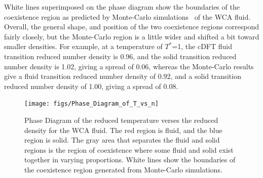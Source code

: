 \documentclass[double,12pt]{beavtex}
\begin{document}
White lines superimposed on the phase diagram show the boundaries of the 
coexistence region as predicted by Monte-Carlo simulations~\cite{May} 
of the WCA fluid. 
Overall, the general shape, and position of the two coexistence regions 
correspond fairly closely, but the Monte-Carlo region is a little wider
and shifted a bit toward smaller densities. For example, at a temperature 
of $T^*$=1, the cDFT fluid transition reduced number density is 0.96, 
and the solid transition reduced number density is 1.02, giving a spread 
of 0.06, whereas the Monte-Carlo results give a fluid transition 
reduced number density of 0.92, and a solid transition reduced number 
density of 1.00, giving a spread of 0.08. 

\begin{figure}
  \centering
  \texttt{[image: figs/Phase\_Diagram\_of\_T\_vs\_n]}
  \caption{Phase Diagram of the reduced temperature verses the reduced 
  density for the WCA fluid. The red region is fluid, and the blue region is 
  solid. The gray area that separates the fluid and solid regions 
  is the region of coexistence where some fluid and solid exist together 
  in varying proportions. White lines show the boundaries of the coexistence 
  region generated from Monte-Carlo simulations.}
  \label{fig:Phase_Diagram_of_T_vs_n}
\end{figure}

%
%
%
\end{document}
